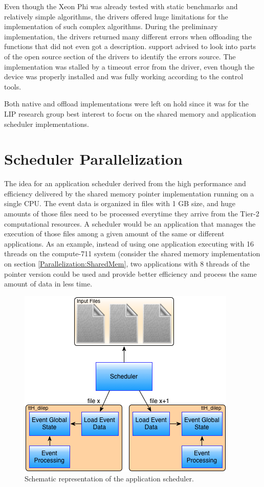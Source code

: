Even though the Xeon Phi was already tested with static benchmarks and relatively simple algorithms, the drivers offered huge limitations for the implementation of such complex algorithms. During the preliminary implementation, the drivers returned many different errors when offloading the functions that did not even got a description. \intel support advised to look into parts of the open source section of the drivers to identify the errors source. The implementation was stalled by a timeout error from the driver, even though the device was properly installed and was fully working according to the \intel control tools.

Both native and offload implementations were left on hold since it was for the LIP research group best interest to focus on the shared memory and application scheduler implementations.

\section{Scheduler Parallelization}
\label{Parallelization:Scheduler}

The idea for an application scheduler derived from the high performance and efficiency delivered by the shared memory pointer implementation running on a single CPU. The event data is organized in files with 1 GB size, and huge amounts of those files need to be processed everytime they arrive from the Tier-2 computational resources. A scheduler would be an application that manages the execution of those files among a given amount of the same or different applications. As an example, instead of using one application executing with 16 threads on the compute-711 system (consider the shared memory implementation on section \ref{Parallelization:SharedMem}, two applications with 8 threads of the pointer version could be used and provide better efficiency and process the same amount of data in less time.

\begin{figure}[!htp]
	\begin{center}
		\includegraphics[scale=0.7]{../../common/img/scheduler_workflow.png}
		\caption{Schematic representation of the application scheduler.}
		\label{fig:SchedulerWorkflow}
	\end{center}
\end{figure}

